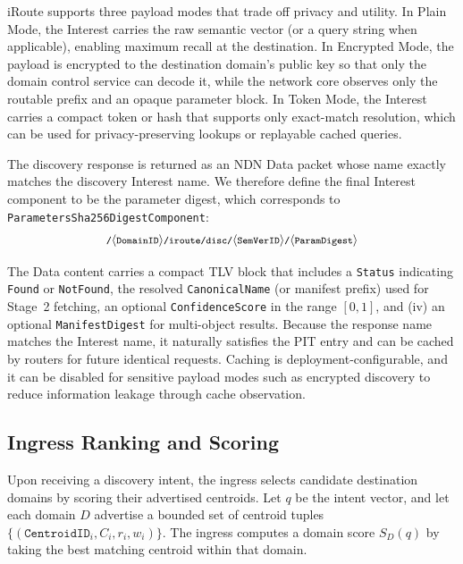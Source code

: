 \documentclass[journal]{IEEEtran}
\newcommand{\sysname}{iRoute}
\newcommand{\PSDC}{\texttt{ParametersSha256Digest\allowbreak Component}}
\begin{document}
\sysname{} supports three payload modes that trade off privacy and utility.
In Plain Mode, the Interest carries the raw semantic vector (or a query string when applicable), enabling maximum recall at the destination.
In Encrypted Mode, the payload is encrypted to the destination domain's public key so that only the domain control service can decode it, while the network core observes only the routable prefix and an opaque parameter block.
In Token Mode, the Interest carries a compact token or hash that supports only exact-match resolution, which can be used for privacy-preserving lookups or replayable cached queries.

The discovery response is returned as an NDN Data packet whose name exactly matches the discovery Interest name.
We therefore define the final Interest component to be the parameter digest, which corresponds to \PSDC:
{\setlength{\abovedisplayskip}{2pt}\setlength{\belowdisplayskip}{2pt}
\begin{equation*}
\footnotesize
\texttt{/}\allowbreak\langle \texttt{DomainID} \rangle
\texttt{/iroute/disc/}\allowbreak\langle \texttt{SemVerID} \rangle
\texttt{/}\allowbreak\langle \texttt{ParamDigest} \rangle
\end{equation*}}

The Data content carries a compact TLV block that includes a \texttt{Status} indicating \texttt{Found} or \texttt{NotFound}, the resolved \texttt{CanonicalName} (or manifest prefix) used for Stage~2 fetching, an optional \texttt{ConfidenceScore} in the range $[0,1]$, and (iv) an optional \texttt{ManifestDigest} for multi-object results.
Because the response name matches the Interest name, it naturally satisfies the PIT entry and can be cached by routers for future identical requests.
Caching is deployment-configurable, and it can be disabled for sensitive payload modes such as encrypted discovery to reduce information leakage through cache observation.


\subsection{Ingress Ranking and Scoring}
\label{sec:spec_ranking}

Upon receiving a discovery intent, the ingress selects candidate destination domains by scoring their advertised centroids.
Let $q$ be the intent vector, and let each domain $D$ advertise a bounded set of centroid tuples $\{(\texttt{CentroidID}_i, C_i, r_i, w_i)\}$.
The ingress computes a domain score $S_D(q)$ by taking the best matching centroid within that domain.
\end{document}
